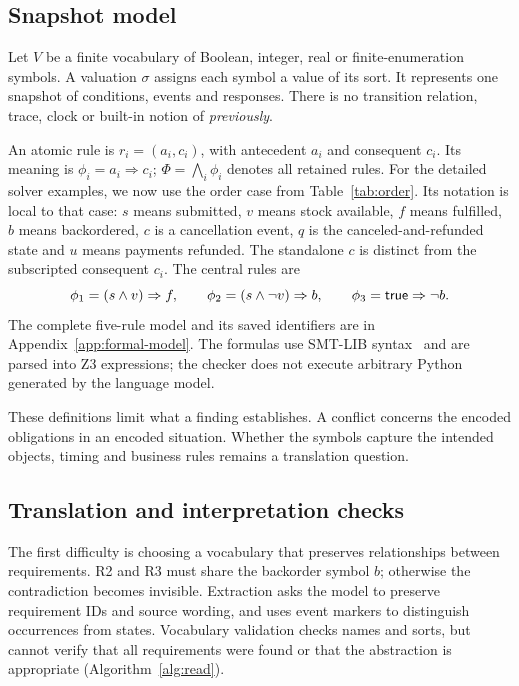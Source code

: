 \subsection{Snapshot model}\label{sec:model}

Let $V$ be a finite vocabulary of Boolean, integer, real or finite-enumeration symbols. A valuation $\sigma$ assigns each symbol a value of its sort. It represents one snapshot of conditions, events and responses. There is no transition relation, trace, clock or built-in notion of \emph{previously}.

An atomic rule is $r_i=(a_i,c_i)$, with antecedent $a_i$ and consequent $c_i$. Its meaning is $\phi_i=a_i\Rightarrow c_i$; $\Phi=\bigwedge_i\phi_i$ denotes all retained rules. For the detailed solver examples, we now use the order case from Table~\ref{tab:order}. Its notation is local to that case: $s$ means submitted, $v$ means stock available, $f$ means fulfilled, $b$ means backordered, $c$ is a cancellation event, $q$ is the canceled-and-refunded state and $u$ means payments refunded. The standalone $c$ is distinct from the subscripted consequent $c_i$. The central rules are
\[
 \phi_1=(s\land v)\Rightarrow f,\qquad
 \phi_2=(s\land\neg v)\Rightarrow b,\qquad
 \phi_3=\mathsf{true}\Rightarrow\neg b.
\]
The complete five-rule model and its saved identifiers are in Appendix~\ref{app:formal-model}. The formulas use SMT-LIB syntax~\citep{smtlib} and are parsed into Z3 expressions; the checker does not execute arbitrary Python generated by the language model.

These definitions limit what a finding establishes. A conflict concerns the encoded obligations in an encoded situation. Whether the symbols capture the intended objects, timing and business rules remains a translation question.

\subsection{Translation and interpretation checks}\label{sec:formalize}

The first difficulty is choosing a vocabulary that preserves relationships between requirements. R2 and R3 must share the backorder symbol $b$; otherwise the contradiction becomes invisible. Extraction asks the model to preserve requirement IDs and source wording, and uses event markers to distinguish occurrences from states. Vocabulary validation checks names and sorts, but cannot verify that all requirements were found or that the abstraction is appropriate (Algorithm~\ref{alg:read}).

